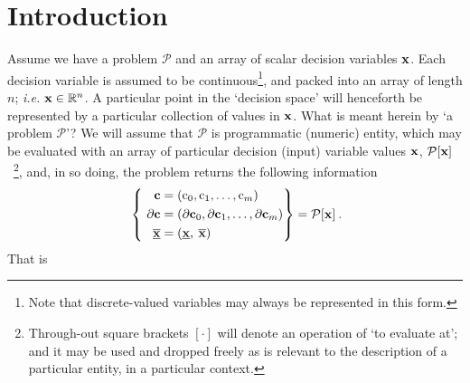 \documentclass[11pt]{article}
\begin{document}
\section{Introduction}
Assume we have a problem $\mathcal{P}$ and an array of scalar decision variables $\mathbf{x}$. Each decision variable is assumed to be continuous\footnote{Note that discrete-valued variables may always be represented in this form.}, and packed into an array of length $n$; \emph{i.e.} $\mathbf{x} \in \mathbb{R}^n$. A particular point in the `decision space' will henceforth be represented by a particular collection of values in $\mathbf{x}$. What is meant herein by `a problem $\mathcal{P}$'? We will assume that $\mathcal{P}$ is programmatic (numeric) entity, which may be evaluated with an array of particular decision (input) variable values $\mathbf{x}$, $\mathcal{P}[\mathbf{x}]$~\footnote{Through-out square brackets $[\cdot]$ will denote an operation of `to evaluate at'; and it may be used and dropped freely as is relevant to the description of a particular entity, in a particular context.}, and, in so doing, the problem returns the following information
\begin{align}
\label{d:eqn:p}
 ~\left\{ ~
\begin{aligned}
\mathbf{c} &= (\textrm{c}_0, \textrm{c}_1, \ldots, \textrm{c}_m ) \\
\mathbf{\partial c} & = (\mathbf{\partial c}_0 , \mathbf{\partial c}_1 , \ldots,\mathbf{\partial c}_m  ) \\ \underline{\overline{\mathbf{x}}} & = ( \underline{\mathbf{x}} , \: \overline{\mathbf{x}} ) \:
\end{aligned}\right\} =
\mathcal{P} [\mathbf{x}] \: .
\end{align}
That is 
\end{document}
